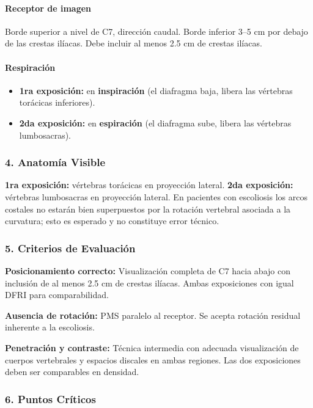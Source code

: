 	\paragraph{Receptor de imagen}
	Borde superior a nivel de C7, dirección caudal. Borde inferior 3--5 cm por debajo de las crestas ilíacas. Debe incluir al menos 2.5 cm de crestas ilíacas.
	
	\paragraph{Respiración}
	\begin{itemize}
		\item \textbf{1ra exposición:} en \textbf{inspiración} (el diafragma baja, libera las vértebras torácicas inferiores).
		\item \textbf{2da exposición:} en \textbf{espiración} (el diafragma sube, libera las vértebras lumbosacras).
	\end{itemize}
	
	\subsubsection*{4. Anatomía Visible}
	
	\textbf{1ra exposición:} vértebras torácicas en proyección lateral.
	\textbf{2da exposición:} vértebras lumbosacras en proyección lateral. En pacientes con escoliosis los arcos costales no estarán bien superpuestos por la rotación vertebral asociada a la curvatura; esto es esperado y no constituye error técnico.
	
	\subsubsection*{5. Criterios de Evaluación}
	
	\textbf{Posicionamiento correcto:} Visualización completa de C7 hacia abajo con inclusión de al menos 2.5 cm de crestas ilíacas. Ambas exposiciones con igual DFRI para comparabilidad.
	
	\textbf{Ausencia de rotación:} PMS paralelo al receptor. Se acepta rotación residual inherente a la escoliosis.
	
	\textbf{Penetración y contraste:} Técnica intermedia con adecuada visualización de cuerpos vertebrales y espacios discales en ambas regiones. Las dos exposiciones deben ser comparables en densidad.
	
	\subsubsection*{6. Puntos Críticos}
	
